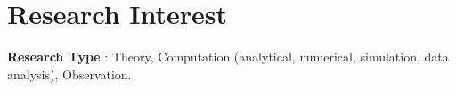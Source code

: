 \section{Research Interest}

        \textbf{Research Type} :
        Theory, Computation (analytical, numerical, simulation, data analysis), Observation. \\
    